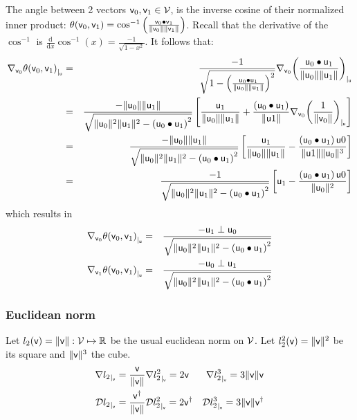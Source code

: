 The angle between 2 vectors $\mathsf{v}_0, \mathsf{v}_1 \in \mathcal{V}$,
is the inverse cosine of their normalized inner product:
$\theta(\mathsf{v}_0,\mathsf{v}_1)
=
\cos^{-1} \left( \frac{ \mathsf{v}_0 \bullet \mathsf{v}_1 } {\|\mathsf{v}_0\| \|\mathsf{v}_1\|} \right)$.
Recall that the derivative of the $\cos^{-1}$ is
$\frac{\mathrm d}{\mathrm dx} \cos^{-1}(x) = \frac{-1}{\sqrt{1 - x^2} }$.
It follows that:
\begin{eqnarray*}
{\mathbf \nabla}_{\mathsf{v}_0}{{\theta(\mathsf{v}_0,\mathsf{v}_1)}}_{\mid_{\mathsf{u}}}
& = &
\frac{-1}
{ \sqrt{1 - \left( \frac{\mathsf{u}_0 \bullet \mathsf{u}_1}{\| \mathsf{u}_0 \| \| \mathsf{u}_1 \|} \right)^2 }}
{\mathbf \nabla}_{\mathsf{v}_0}{{\left( \frac{\mathsf{u}_0 \bullet \mathsf{u}_1}{\| \mathsf{u}_0 \| \| \mathsf{u}_1 \|} \right)}}_{\mid_{\mathsf{u}}}
\\
& = &
\frac{-\|\mathsf{u}_0\|\|\mathsf{u}_1\|}
{ \sqrt{\|\mathsf{u}_0\|^2\|\mathsf{u}_1\|^2 - \left( \mathsf{u}_0 \bullet \mathsf{u}_1 \right)^2 }}
\left[
\frac{\mathsf{u}_1}{\|\mathsf{u}_0\|\|\mathsf{u}_1\|}
+
\frac{\left( \mathsf{u}_0 \bullet \mathsf{u}_1 \right)}{\| \mathsf{u}1 \|}
{\mathbf \nabla}_{\mathsf{v}_0}{{\left( \frac{1}{\| \mathsf{v}_0 \|} \right)}}_{\mid_{\mathsf{u}}}
\right]
\nonumber
\\
& = &
\frac{-\|\mathsf{u}_0\|\|\mathsf{u}_1\|}
{ \sqrt{\|\mathsf{u}_0\|^2\|\mathsf{u}_1\|^2 - \left( \mathsf{u}_0 \bullet \mathsf{u}_1 \right)^2 }}
\left[
\frac{\mathsf{u}_1}{\|\mathsf{u}_0\|\|\mathsf{u}_1\|}
-
\frac{\left( \mathsf{u}_0 \bullet \mathsf{u}_1 \right) \mathsf{u}0}{\| \mathsf{u}1 \| \|\mathsf{u}_0\|^3}
\right]
\nonumber
\\
& = &
\frac{-1}
{ \sqrt{\|\mathsf{u}_0\|^2\|\mathsf{u}_1\|^2 - \left( \mathsf{u}_0 \bullet \mathsf{u}_1 \right)^2 }}
\left[
\mathsf{u}_1
-
\frac{\left( \mathsf{u}_0 \bullet \mathsf{u}_1 \right) \mathsf{u}0}{\|\mathsf{u}_0\|^2}
\right]
\nonumber
\end{eqnarray*}
which results in
\begin{eqnarray}
\label{eq:angle_gradient}
{\mathbf \nabla}_{\mathsf{v}_0}{{\theta(\mathsf{v}_0,\mathsf{v}_1)}}_{\mid_{\mathsf{u}}}
& = &
\frac{- \mathsf{u}_1 \perp \mathsf{u}_0}
{ \sqrt{\|\mathsf{u}_0\|^2\|\mathsf{u}_1\|^2 - \left( \mathsf{u}_0 \bullet \mathsf{u}_1 \right)^2 }}
\\
{\mathbf \nabla}_{\mathsf{v}_1}{{\theta(\mathsf{v}_0,\mathsf{v}_1)}}_{\mid_{\mathsf{u}}}
& = &
\frac{- \mathsf{u}_0 \perp \mathsf{u}_1}
{ \sqrt{\|\mathsf{u}_0\|^2\|\mathsf{u}_1\|^2 - \left( \mathsf{u}_0 \bullet \mathsf{u}_1 \right)^2 }}
\nonumber
\end{eqnarray}


\subsubsection{Euclidean norm}
\label{sec:Euclidean-norm}

Let $l_2(\mathsf{v}) = \| \mathsf{v}  \|: \mathcal{V} \mapsto \mathbb{R}$
be the usual euclidean norm on $\mathcal{V}$.
Let $l_2^2(\mathsf{v}) = \| \mathsf{v}  \|^2 $
be its square and $ \| \mathsf{v}  \|^3$ the cube.
\begin{eqnarray}
\label{eq:l2-gradient}
{\mathbf \nabla}{l_2}_{\mid_{\mathsf{v}}} = \frac{ \mathsf{v} }{ \| \mathsf{v}  \|} &
{\mathbf \nabla}{l_2^2}_{\mid_{\mathsf{v}}} =  2\mathsf{v} &
{\mathbf \nabla}{l_2^3}_{\mid_{\mathsf{v}}} = 3 \| \mathsf{v}  \| \mathsf{v} \\
{\mathcal{D}{l_2}_{\mid_{\mathsf{v}}}} = \frac{ \mathsf{v}^\dagger }{ \| \mathsf{v}  \|} &
{\mathcal{D}{l_2^2}_{\mid_{\mathsf{v}}}} = 2\mathsf{v}{^\dagger} &
{\mathcal{D}{l_2^3}_{\mid_{\mathsf{v}}}} = 3 \| \mathsf{v}  \| \mathsf{v}^\dagger \nonumber
\end{eqnarray}

